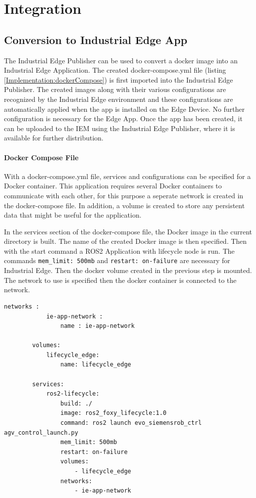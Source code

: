\section{Integration}
\label{Implementierung:Integration}

\subsection{Conversion to Industrial Edge App} 
The Industrial Edge Publisher can be used to convert a docker image into an Industrial Edge Application. The created docker-compose.yml file (listing \ref{Implementation:dockerCompose}) is first imported into the Industrial Edge Publisher. The created images along with their various configurations are recognized by the Industrial Edge environment and these configurations are automatically applied when the app is installed on the Edge Device. No further configuration is necessary for the Edge App. Once the app has been created, it can be uploaded to the IEM using the Industrial Edge Publisher, where it is available for further distribution.

\paragraph{Docker Compose File}
With a docker-compose.yml file, services and configurations can be specified for a Docker container. This application requires several Docker containers to communicate with each other, for this purpose a seperate network is created in the docker-compose file. In addition, a volume is created to store any persistent data that might be useful for the application.

In the services section of the docker-compose file, the Docker image in the current directory is built. The name of the created Docker image is then specified. Then with the start command a \gls{ROS2} Application with lifecycle node is run. The commands \lstinline{mem_limit: 500mb} and \lstinline{restart: on-failure} are necessary for Industrial Edge. Then the docker volume created in the previous step is mounted. The network to use is specified then the docker container is connected to the network.
\begin{lstlisting}[language=docker-compose,
		caption={docker-compose.yaml used by IE Publisher},
		label={Implementation:dockerCompose}]
		networks :
 			ie-app-network :
	 			name : ie-app-network

		volumes:
			lifecycle_edge:
				name: lifecycle_edge
		
		services:
			ros2-lifecycle:
				build: ./
				image: ros2_foxy_lifecycle:1.0
				command: ros2 launch evo_siemensrob_ctrl agv_control_launch.py 
				mem_limit: 500mb
				restart: on-failure
				volumes:
					- lifecycle_edge
				networks:
					- ie-app-network		
\end{lstlisting}
	
